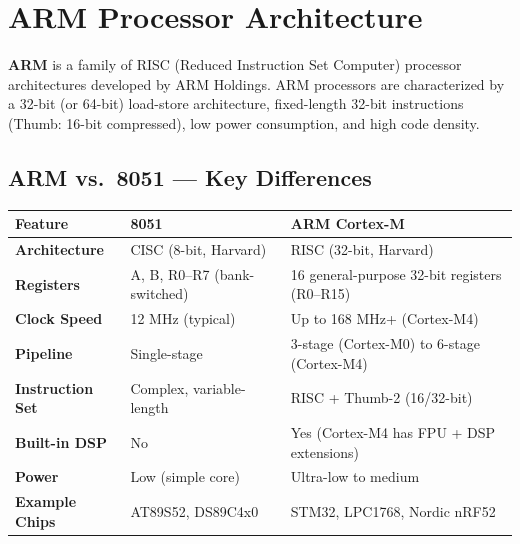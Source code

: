 \documentclass[12pt,a4paper]{article}
\renewcommand{\arraystretch}{1.45}
\begin{document}
\section{ARM Processor Architecture}

\begin{tcolorbox}[defbox, title={\textbf{ARM (Advanced RISC Machine) Processor}}]
\textbf{ARM} is a family of RISC (Reduced Instruction Set Computer) processor architectures developed by ARM Holdings. ARM processors are characterized by a 32-bit (or 64-bit) load-store architecture, fixed-length 32-bit instructions (Thumb: 16-bit compressed), low power consumption, and high code density.
\end{tcolorbox}

\subsection{ARM vs.\ 8051 --- Key Differences}

\par\noindent
{\renewcommand{\arraystretch}{1.6}%
\begin{tabularx}{\linewidth}{|B{3.0cm}|Y|Y|}
\hline
\textbf{Feature} & \textbf{8051} & \textbf{ARM Cortex-M} \\
\hline
\textbf{Architecture} & CISC (8-bit, Harvard) & RISC (32-bit, Harvard) \\
\hline
\textbf{Registers} & A, B, R0--R7 (bank-switched) & 16 general-purpose 32-bit registers (R0--R15) \\
\hline
\textbf{Clock Speed} & 12 MHz (typical) & Up to 168 MHz+ (Cortex-M4) \\
\hline
\textbf{Pipeline} & Single-stage & 3-stage (Cortex-M0) to 6-stage (Cortex-M4) \\
\hline
\textbf{Instruction Set} & Complex, variable-length & RISC + Thumb-2 (16/32-bit) \\
\hline
\textbf{Built-in DSP} & No & Yes (Cortex-M4 has FPU + DSP extensions) \\
\hline
\textbf{Power} & Low (simple core) & Ultra-low to medium \\
\hline
\textbf{Example Chips} & AT89S52, DS89C4x0 & STM32, LPC1768, Nordic nRF52 \\
\hline
\end{tabularx}}
\end{document}
